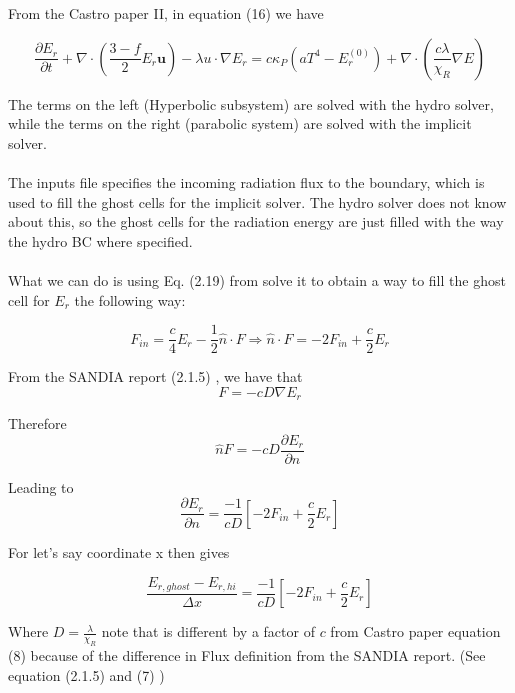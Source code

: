 \documentclass[11pt]{article}
\begin{document}
	
	From the Castro paper II, \cite{castroGray} in equation (16) we have
	
	\begin{equation}	
	 \frac{\partial E_r}{\partial t} + \nabla \cdot \left( \frac{3-f}{2} E_r \bm{u}\right) - \lambda u \cdot \nabla E_r = c \kappa_P \left( a T^4 - E^{(0)}_r\right) + \nabla \cdot \left( \frac{c\lambda}{\chi_R} \nabla E\right) 
	\end{equation}

The terms on the left (Hyperbolic subsystem) are solved with the hydro solver, while the terms on the right (parabolic system) are solved with the implicit solver. \\~\\

The inputs file specifies the incoming radiation flux to the boundary, which is used to fill the ghost cells for the implicit solver. The hydro solver does not know about this, so the ghost cells for the radiation energy are just filled with the way the hydro BC where specified. \\~\\

What we can do is using Eq. (2.19) from \cite{advinrad} solve it to obtain a way to fill the ghost cell for $E_r$ the following way:

\begin{equation}
	F_{in} = \frac{c}{4}E_r - \frac{1}{2} \hat{n} \cdot F \Rightarrow
	\hat{n} \cdot F = -2 F_{in} + \frac{c}{2} E_r
\end{equation}

From the SANDIA report (2.1.5) , we have that 
\begin{equation}
	F = -c D \nabla E_r
\end{equation}
 
 Therefore
\begin{equation}
	\hat{n} F = -cD \frac{\partial E_r}{\partial n}
\end{equation}

Leading to 
\begin{equation}
	\frac{\partial E_r}{\partial n} = \frac{-1}{cD} \left[ -2 F_{in} + \frac{c}{2} E_r\right]
\end{equation}

For let's say coordinate x then gives  
 
	 \begin{equation}
	 	\frac{E_{r,ghost} - E_{r,hi}}{\Delta x} =  \frac{-1}{cD} \left[ -2 F_{in} + \frac{c}{2} E_r\right]
	 \end{equation}
	 
Where $D = \frac{\lambda}{\chi_R}$ note that is different by a factor of $c$ from Castro paper equation (8) because of the difference in Flux definition from the SANDIA report. (See equation (2.1.5) and (7) )
	

	{}
    
\end{document}
